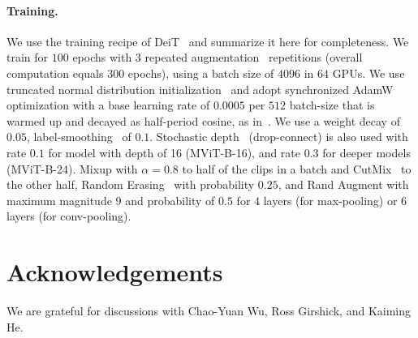 \documentclass[10pt,twocolumn,letterpaper]{article}
\begin{document}
\paragraph{Training.}
We use the training recipe of DeiT~\cite{touvron2020training} and summarize it here for completeness. We train for $100$ epochs with $3$ repeated augmentation~\cite{hoffer2020augment} repetitions (overall computation equals $300$ epochs), using a batch size of $4096$ in $64$ GPUs. We use truncated normal distribution initialization~\cite{hanin2018start} and adopt synchronized AdamW~\cite{loshchilov2018fixing} optimization with a base learning rate of $0.0005$ per $512$ batch-size that is warmed up and decayed as half-period cosine, as in~\cite{touvron2020training}. We use a weight decay of $0.05$, label-smoothing~\cite{Szegedy2015a} of $0.1$. Stochastic depth~ \cite{huang2016deep} (\ie drop-connect) is also used with rate $0.1$ for model with depth of 16 ({MViT}-B-16), and rate $0.3$ for deeper models ({MViT}-B-24). Mixup \cite{zhang2018mixup} with $\alpha=0.8$ to half of the clips in a batch and CutMix~\cite{yun2019cutmix} to the other half, Random Erasing~\cite{zhong2020random} with probability $0.25$, and 
Rand Augment \cite{cubuk2020randaugment} with maximum magnitude $9$ and probability of $0.5$ for $4$ layers (for max-pooling) or $6$ layers (for conv-pooling). 
\section*{Acknowledgements} We are grateful for discussions with Chao-Yuan Wu, Ross Girshick, and Kaiming He.\\ 
{
	\small
	
	
}
\end{document}

